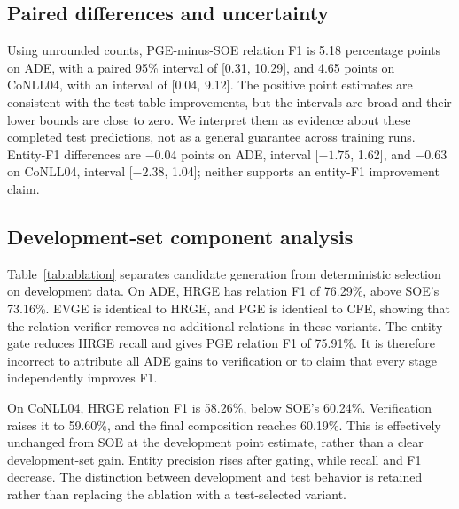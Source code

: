\documentclass[preprint,12pt]{elsarticle}
\begin{document}
\begin{table}[htbp]
\centering\small\setlength{\tabcolsep}{4pt}
\caption{Test stability across two additional training repetitions under the common strict-span
evaluator (micro \%, mean $\pm$ sample standard deviation; $n=2$). The final
column is the mean PGE-minus-SOE relation-F1 difference.}
\label{tab:repeated-runs}

\end{table}

\subsection{Paired differences and uncertainty}
Using unrounded counts, PGE-minus-SOE relation F1 is 5.18 percentage points
on ADE, with a paired 95\% interval of [0.31, 10.29], and 4.65 points on
CoNLL04, with an interval of [0.04, 9.12]. The positive point estimates are
consistent with the test-table improvements, but the intervals are broad and
their lower bounds are close to zero. We interpret them as evidence about
these completed test predictions, not as a general guarantee across training runs.
Entity-F1 differences are $-0.04$ points on ADE, interval [$-1.75$, 1.62], and
$-0.63$ on CoNLL04, interval [$-2.38$, 1.04]; neither supports an entity-F1
improvement claim.

\subsection{Development-set component analysis}
Table~\ref{tab:ablation} separates candidate generation from deterministic
selection on development data. On ADE, HRGE has relation F1 of 76.29\%, above
SOE's 73.16\%. EVGE is identical to HRGE, and PGE is identical to CFE, showing
that the relation verifier removes no additional relations in these variants.
The entity gate reduces HRGE recall and gives PGE relation F1 of 75.91\%.
It is therefore incorrect to attribute all ADE gains to verification or to
claim that every stage independently improves F1.

On CoNLL04, HRGE relation F1 is 58.26\%, below SOE's 60.24\%. Verification
raises it to 59.60\%, and the final composition reaches 60.19\%. This is
effectively unchanged from SOE at the development point estimate, rather than
a clear development-set gain. Entity precision rises after gating, while
recall and F1 decrease. The distinction between development and test behavior
is retained rather than replacing the ablation with a test-selected variant.
\end{document}
